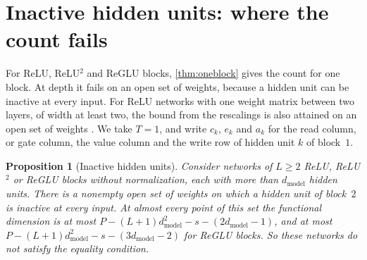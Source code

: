 \documentclass[10pt]{article}
\newtheorem{proposition}[theorem]{Proposition}
\theoremstyle{definition}
\theoremstyle{remark}
\newcommand{\dm}{d_{\mathrm{model}}}
\begin{document}
\section{Inactive hidden units: where the count fails}\label{app:dead}

For ReLU, ReLU$^2$ and ReGLU blocks, \cref{thm:oneblock} gives the count for one block. At depth it fails on an open set of weights, because a hidden unit can be inactive at every input. For ReLU networks with one weight matrix between two layers, of width at least two, the bound from the rescalings is also attained on an open set of weights \citep[Theorem~4.11]{grillo2026most}. We take $T = 1$, and write $c_k$, $e_k$ and $a_k$ for the read column, or gate column, the value column and the write row of hidden unit $k$ of block~$1$.

\begin{proposition}[Inactive hidden units]\label{prop:deadskipless}
Consider networks of $L \ge 2$ ReLU, ReLU$^2$ or ReGLU blocks without normalization, each with more than $\dm$ hidden units. There is a nonempty open set of weights on which a hidden unit of block~$2$ is inactive at every input. At almost every point of this set the functional dimension is at most $P - (L+1)\dm^2 - s - (2\dm - 1)$, and at most $P - (L+1)\dm^2 - s - (3\dm - 2)$ for ReGLU blocks. So these networks do not satisfy the equality condition.
\end{proposition}
\end{document}
